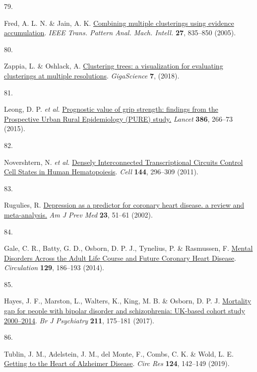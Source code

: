 \documentclass[
  a4paper,
]{article}
\newlength{\cslhangindent}
\newlength{\csllabelwidth}
\newlength{\cslentryspacingunit} %
\newenvironment{CSLReferences}[2] %
 {%
  \setlength{\parindent}{0pt}
  \ifodd #1
  \let\oldpar\par
  \def\par{\hangindent=\cslhangindent\oldpar}
  \fi
  \setlength{\parskip}{#2\cslentryspacingunit}
 }%
 {}
\newcommand{\CSLLeftMargin}[1]{\parbox[t]{\csllabelwidth}{#1}}
\newcommand{\CSLRightInline}[1]{\parbox[t]{\linewidth - \csllabelwidth}{#1}\break}
\begin{document}
\begin{CSLReferences}{0}{0}
\leavevmode{}%
\CSLLeftMargin{79. }%
\CSLRightInline{Fred, A. L. N. \& Jain, A. K. \href{https://doi.org/10.1109/tpami.2005.113}{Combining multiple clusterings using evidence accumulation}. \emph{IEEE Trans. Pattern Anal. Mach. Intell.} \textbf{27}, 835--850 (2005).}

\leavevmode{}%
\CSLLeftMargin{80. }%
\CSLRightInline{Zappia, L. \& Oshlack, A. \href{https://doi.org/10.1093/gigascience/giy083}{Clustering trees: a visualization for evaluating clusterings at multiple resolutions}. \emph{GigaScience} \textbf{7}, (2018).}

\leavevmode{}%
\CSLLeftMargin{81. }%
\CSLRightInline{Leong, D. P. \emph{et al.} \href{https://doi.org/10.1016/s0140-6736(14)62000-6}{Prognostic value of grip strength: findings from the Prospective Urban Rural Epidemiology (PURE) study.} \emph{Lancet} \textbf{386}, 266--73 (2015).}

\leavevmode{}%
\CSLLeftMargin{82. }%
\CSLRightInline{Novershtern, N. \emph{et al.} \href{https://doi.org/10.1016/j.cell.2011.01.004}{Densely Interconnected Transcriptional Circuits Control Cell States in Human Hematopoiesis}. \emph{Cell} \textbf{144}, 296--309 (2011).}

\leavevmode{}%
\CSLLeftMargin{83. }%
\CSLRightInline{Rugulies, R. \href{https://doi.org/10.1016/s0749-3797(02)00439-7}{Depression as a predictor for coronary heart disease. a review and meta-analysis.} \emph{Am J Prev Med} \textbf{23}, 51--61 (2002).}

\leavevmode{}%
\CSLLeftMargin{84. }%
\CSLRightInline{Gale, C. R., Batty, G. D., Osborn, D. P. J., Tynelius, P. \& Rasmussen, F. \href{https://doi.org/10.1161/circulationaha.113.002065}{Mental Disorders Across the Adult Life Course and Future Coronary Heart Disease}. \emph{Circulation} \textbf{129}, 186--193 (2014).}

\leavevmode{}%
\CSLLeftMargin{85. }%
\CSLRightInline{Hayes, J. F., Marston, L., Walters, K., King, M. B. \& Osborn, D. P. J. \href{https://doi.org/10.1192/bjp.bp.117.202606}{Mortality gap for people with bipolar disorder and schizophrenia: UK-based cohort study 2000--2014}. \emph{Br J Psychiatry} \textbf{211}, 175--181 (2017).}

\leavevmode{}%
\CSLLeftMargin{86. }%
\CSLRightInline{Tublin, J. M., Adelstein, J. M., del Monte, F., Combs, C. K. \& Wold, L. E. \href{https://doi.org/10.1161/circresaha.118.313563}{Getting to the Heart of Alzheimer Disease}. \emph{Circ Res} \textbf{124}, 142--149 (2019).}


\end{CSLReferences}
\end{document}
